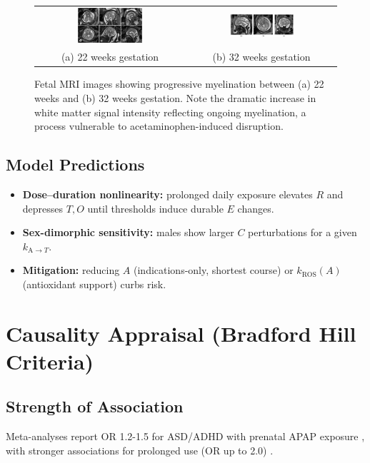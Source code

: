 \documentclass[12pt]{article}
\begin{document}
\begin{figure}[h]
\centering
\begin{tabular}{cc}
\includegraphics[width=0.45\textwidth]{../assets/fetal-mri-22wks.webp} &
\includegraphics[width=0.45\textwidth]{../assets/fetal-mri-32wks.png} \\
(a) 22 weeks gestation & (b) 32 weeks gestation
\end{tabular}
\caption{Fetal MRI images showing progressive myelination between (a) 22 weeks and (b) 32 weeks gestation. Note the dramatic increase in white matter signal intensity reflecting ongoing myelination, a process vulnerable to acetaminophen-induced disruption.}
\label{fig:fetal-mri-comparison}
\end{figure}


\subsection{Model Predictions}
\begin{itemize}
  \item \textbf{Dose--duration nonlinearity:} prolonged daily exposure elevates $R$ and depresses $T,O$ until thresholds induce durable $E$ changes.
  \item \textbf{Sex-dimorphic sensitivity:} males show larger $C$ perturbations for a given $k_{\mathrm{A}\to T}$.
  \item \textbf{Mitigation:} reducing $A$ (indications-only, shortest course) or $k_{\mathrm{ROS}}(A)$ (antioxidant support) curbs risk.
\end{itemize}

\section{Causality Appraisal (Bradford Hill Criteria)}

\subsection{Strength of Association}
Meta-analyses report OR 1.2-1.5 for ASD/ADHD with prenatal APAP exposure \citep{masarwa2018}, with stronger associations for prolonged use (OR up to 2.0) \citep{liew2014,thompson2014}.
\end{document}
